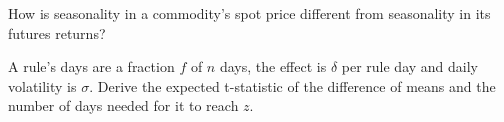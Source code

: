 \begin{interviewq}\label{iq:s1:seasonality-and-calendar-effects:5}
How is seasonality in a commodity's spot price different from seasonality in its futures returns?
\end{interviewq}

\begin{interviewq}\label{iq:s1:seasonality-and-calendar-effects:6}
A rule's days are a fraction $f$ of $n$ days, the effect is $\delta$ per rule day and daily volatility is $\sigma$. Derive the expected t-statistic of the
difference of means and the number of days needed for it to reach $z$.
\end{interviewq}
